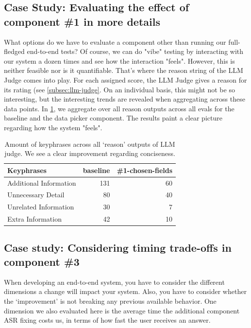 \documentclass{article}
\begin{document}
\subsection{Case Study: Evaluating the effect of component \#1 in more details}

What options do we have to evaluate a component other than running our full-fledged end-to-end tests? Of course, we can do "vibe" testing by interacting with our system a dozen times and see how the interaction "feels". However, this is neither feasible nor is it quantifiable. That's where the reason string of the LLM Judge comes into play. For each assigned score, the LLM Judge gives a reason for its rating (see \ref{subsec:llm-judge}. On an individual basis, this might not be so interesting, but the interesting trends are revealed when aggregating across these data points. In \ref{tab:conciseness}, we aggregate over all reason outputs across all evals for the baseline and the data picker component. The results paint a clear picture regarding how the system "feels".

\begin{table}[H]
\centering
\begin{tabular}{lrr}
\hline
\textbf{Keyphrases} & \textbf{baseline} & \textbf{\#1-chosen-fields} \\
\hline
Additional Information & 131 & 60 \\
Unnecessary Detail     & 80  & 40 \\
Unrelated Information  & 30  & 7  \\
Extra Information      & 42  & 10 \\
\hline
\end{tabular}
\caption{Amount of keyphrases across all `reason' outputs of LLM judge. We see a clear improvement regarding conciseness.}
\label{tab:conciseness}
\end{table}

\subsection{Case study: Considering timing trade-offs in component \#3}

When developing an end-to-end system, you have to consider the different dimensions a change will impact your system. Also, you have to consider whether the `improvement' is not breaking any previous available behavior. One dimension we also evaluated here is the average time the additional component ASR fixing costs us, in terms of how fast the user receives an answer.
\end{document}
